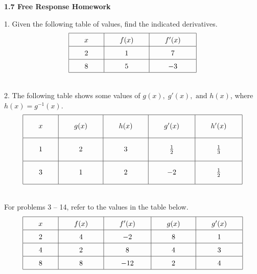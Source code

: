 \newpage

\textbf{\large{1.7 Free Response Homework}} \par

1. Given the following table of values, find the indicated derivatives. \begin{align*}
    \arraycolsep=22pt\def\arraystretch{1.5}
    \begin{array}{|c|c|c|}
        \hline
        x & f(x) & f'(x) \\ \hline
        2 & 1 & 7 \\ \hline
        8 & 5 & -3 \\
        \hline
    \end{array}
\end{align*}

\hspace{0.05\textwidth} \\[11pt]

2. The following table shows some values of $g(x), \; g'(x), \text{ and } h(x)$, where $h(x) = g^{-1}(x)$. \begin{align*}
    \arraycolsep=22pt\def\arraystretch{2.2} 
    \begin{array}{|c|c|c|c|c|}
        \hline
        x & g(x) & h(x) & g'(x) & h'(x) \\[5.5pt] \hline
        1 & 2 & 3 & \frac{1}{2} & \frac{1}{3} \\[5.5pt] \hline
        3 & 1 & 2 & -2 & \frac{1}{2} \\[5.5pt] 
        \hline
    \end{array}
\end{align*}

\hspace{0.05\textwidth} \\[11pt]

For problems 3 -- 14, refer to the values in the table below. \begin{align*}
    \arraycolsep=22pt\def\arraystretch{1.5} 
    \begin{array}{|c|c|c|c|c|}
        \hline
        x & f(x) & f'(x) & g(x) & g'(x) \\ \hline
        2 & 4 & -2 & 8 & 1 \\ \hline
        4 & 2 & 8 & 4 & 3 \\ \hline
        8 & 8 & -12 & 2 & 4 \\
        \hline
    \end{array}
\end{align*}

